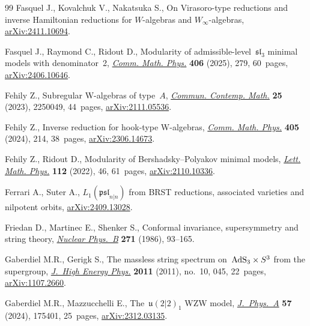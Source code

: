 \begin{thebibliography}{99}
Fasquel J., Kovalchuk V., Nakatsuka S., On {Virasoro}-type reductions and
 inverse {H}amiltonian reductions for {$W$}-algebras and
 {$W_{\infty}$}-algebras,
 \href{http://arxiv.org/abs/2411.10694}{arXiv:2411.10694}.

Fasquel J., Raymond C., Ridout D., Modularity of admissible-level~{$\mathfrak
 {sl}_3$} minimal models with denominator~2,
 \href{https://doi.org/10.1007/s00220-025-05447-7}{\textit{Comm. Math. Phys.}}
 \textbf{406} (2025), 279, 60~pages,
 \href{http://arxiv.org/abs/2406.10646}{arXiv:2406.10646}.

Fehily Z., Subregular {W}-algebras of type~{$A$},
 \href{https://doi.org/10.1142/S0219199722500493}{\textit{Commun. Contemp.
 Math.}} \textbf{25} (2023), 2250049, 44~pages,
 \href{http://arxiv.org/abs/2111.05536}{arXiv:2111.05536}.

Fehily Z., Inverse reduction for hook-type {W}-algebras,
 \href{https://doi.org/10.1007/s00220-024-05082-8}{\textit{Comm. Math. Phys.}}
 \textbf{405} (2024), 214, 38~pages,
 \href{http://arxiv.org/abs/2306.14673}{arXiv:2306.14673}.

Fehily Z., Ridout D., Modularity of {B}ershadsky--{P}olyakov minimal models,
 \href{https://doi.org/10.1007/s11005-022-01536-z}{\textit{Lett. Math. Phys.}}
 \textbf{112} (2022), 46, 61~pages,
 \href{http://arxiv.org/abs/2110.10336}{arXiv:2110.10336}.

Ferrari A., Suter A., {$L_1(\mathfrak{psl}_{n\vert n})$} from {BRST}
 reductions, associated varieties and nilpotent orbits,
 \href{http://arxiv.org/abs/2409.13028}{arXiv:2409.13028}.

Friedan D., Martinec E., Shenker S., Conformal invariance, supersymmetry and
 string theory,
 \href{https://doi.org/10.1016/0550-3213(86)90356-1}{\textit{Nuclear Phys.~B}}
 \textbf{271} (1986), 93--165.

Gaberdiel M.R., Gerigk S., The massless string spectrum on~{${\rm AdS}_3\times
 S^3$} from the supergroup,
 \href{https://doi.org/10.1007/jhep10(2011)045}{\textit{J.~High Energy Phys.}}
 \textbf{2011} (2011), no.~10, 045, 22~pages,
 \href{http://arxiv.org/abs/1107.2660}{arXiv:1107.2660}.

Gaberdiel M.R., Mazzucchelli E., The~{$\mathfrak u(2|2)_1$} {WZW} model,
 \href{https://doi.org/10.1088/1751-8121/ad3ab1}{\textit{J.~Phys.~A}}
 \textbf{57} (2024), 175401, 25~pages,
 \href{http://arxiv.org/abs/2312.03135}{arXiv:2312.03135}.


\end{thebibliography}
